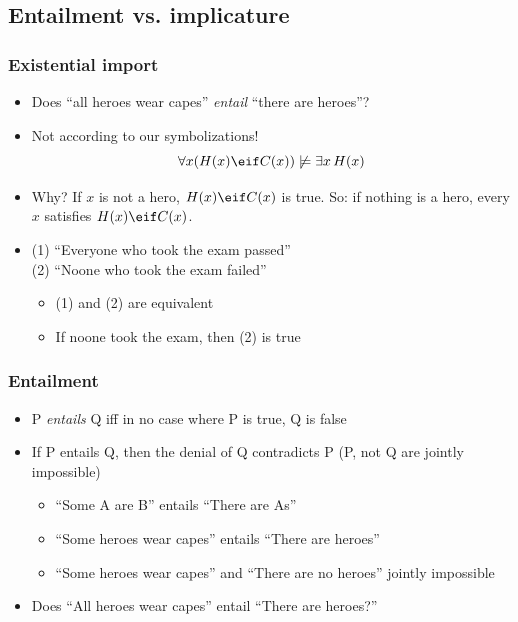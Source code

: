 \subsection{Entailment vs. implicature}

\begin{frame}
  \frametitle{Existential import}

  \begin{itemize}[<+->]
  \item Does ``all heroes wear capes'' \emph{entail} ``there are heroes''?
  \item Not according to our symbolizations!
  \[
  \forall x(H(x) \eif C(x)) \not\models \exists x\,H(x)
  \]
  \item Why? If $x$ is not a hero, $H(x) \eif C(x)$ is true. So: if
  nothing is a hero, every $x$ satisfies $H(x) \eif C(x)$.
  \item (1) ``Everyone who took the exam passed''\\
  (2) ``Noone who took the exam failed''
  \begin{itemize}
  \item (1) and (2) are equivalent
  \item If noone took the exam, then (2) is true
  \end{itemize}\end{itemize}
  \end{frame}

  \begin{frame}
  \frametitle{Entailment}

  \begin{itemize}[<+->]
  \item P \emph{entails} Q iff in no case where P is true, Q is false
  \item If P entails Q, then the denial of Q contradicts P (P, not Q are
  jointly impossible)
  \begin{itemize}[<+->]
  \item ``Some A are B'' entails ``There are As''
  \item ``Some heroes wear capes'' entails ``There are heroes''
  \item ``Some heroes wear capes'' and ``There are no heroes'' jointly impossible
  \end{itemize}\item Does ``All heroes wear capes'' entail ``There are heroes?''
  \end{itemize}
  \end{frame}

